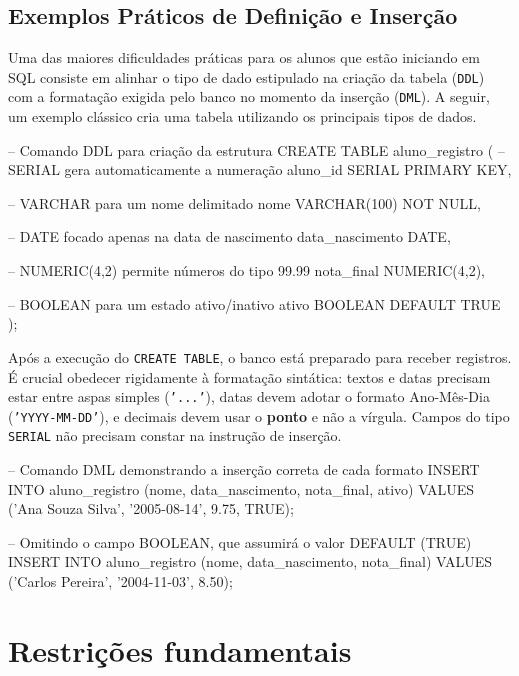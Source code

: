 \subsection{Exemplos Práticos de Definição e Inserção}

Uma das maiores dificuldades práticas para os alunos que estão iniciando em SQL consiste em alinhar o tipo de dado estipulado na criação da tabela (\texttt{DDL}) com a formatação exigida pelo banco no momento da inserção (\texttt{DML}). A seguir, um exemplo clássico cria uma tabela utilizando os principais tipos de dados.

\begin{sqlcode}
-- Comando DDL para criação da estrutura
CREATE TABLE aluno_registro (
    -- SERIAL gera automaticamente a numeração
    aluno_id SERIAL PRIMARY KEY,
    
    -- VARCHAR para um nome delimitado
    nome VARCHAR(100) NOT NULL,
    
    -- DATE focado apenas na data de nascimento
    data_nascimento DATE,
    
    -- NUMERIC(4,2) permite números do tipo 99.99
    nota_final NUMERIC(4,2),
    
    -- BOOLEAN para um estado ativo/inativo
    ativo BOOLEAN DEFAULT TRUE
);
\end{sqlcode}

Após a execução do \texttt{CREATE TABLE}, o banco está preparado para receber registros. É crucial obedecer rigidamente à formatação sintática: textos e datas precisam estar entre aspas simples (\texttt{'...'}), datas devem adotar o formato Ano-Mês-Dia (\texttt{'YYYY-MM-DD'}), e decimais devem usar o \textbf{ponto} e não a vírgula. Campos do tipo \texttt{SERIAL} não precisam constar na instrução de inserção.

\begin{sqlcode}
-- Comando DML demonstrando a inserção correta de cada formato
INSERT INTO aluno_registro (nome, data_nascimento, nota_final, ativo)
VALUES ('Ana Souza Silva', '2005-08-14', 9.75, TRUE);

-- Omitindo o campo BOOLEAN, que assumirá o valor DEFAULT (TRUE)
INSERT INTO aluno_registro (nome, data_nascimento, nota_final)
VALUES ('Carlos Pereira', '2004-11-03', 8.50);
\end{sqlcode}

\section{Restrições fundamentais}

